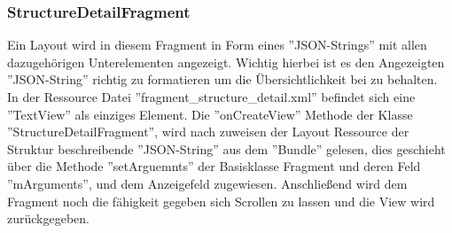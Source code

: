 \subsubsection{StructureDetailFragment}
Ein Layout wird in diesem Fragment in Form eines ''JSON-Strings'' mit allen dazugehörigen Unterelementen angezeigt. Wichtig hierbei ist es den Angezeigten ''JSON-String'' richtig zu formatieren um die Übersichtlichkeit bei zu behalten.
\\
In der Ressource Datei ''fragment\_structure\_detail.xml'' befindet sich eine ''TextView'' als einziges Element. Die ''onCreateView'' Methode der Klasse ''StructureDetailFragment'', wird nach zuweisen der Layout Ressource der Struktur beschreibende ''JSON-String'' aus dem ''Bundle'' gelesen, dies geschieht über die Methode ''setArguemnts'' der Basisklasse Fragment und deren Feld ''mArguments'', und dem Anzeigefeld zugewiesen. Anschließend wird dem Fragment noch die fähigkeit gegeben sich Scrollen zu lassen und die View wird zurückgegeben. 
